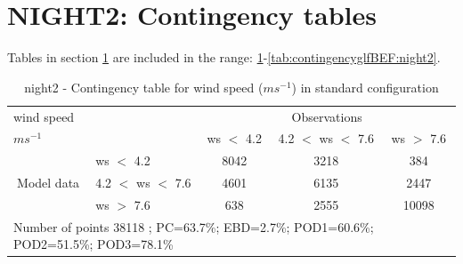 \section{NIGHT2: Contingency tables}\label{sec:night2:cont}
Tables in section \ref{sec:night2:cont} are included in the range: \ref{tab:contingencywsBEF:night2}-\ref{tab:contingencyglfBEF:night2}.
\begin{table}[h!]
\begin{center}
\begin{tabular}{llccc}
\hline
{wind speed}                                       &                                                    & \multicolumn{3}{c}{Observations}                 \\
{$m s^{-1}$}                                       &                             & ws $<$ 4.2   & 4.2 $<$ ws $<$ 7.6 & ws $>$ 7.6 \\
\hline
\multicolumn{1}{c}{\multirow{3}{*}{Model data}}  & ws $<$ 4.2             & 8042                & 3218                       & 384              \\
                                                 & 4.2  $<$ ws $<$ 7.6 & 4601                & 6135                       & 2447              \\
                                                 & ws $>$ 7.6             & 638                & 2555                       & 10098              \\
\hline 
\multicolumn{5}{l}{ Number of points        38118 ; PC=63.7\%; EBD=2.7\%; POD1=60.6\%; POD2=51.5\%; POD3=78.1\%}                 \\
\end{tabular}
\end{center}
\caption{night2 - Contingency table for {wind speed} ($m s^{-1}$) in standard configuration}
\label{tab:contingencywsBEF:night2}
\end{table}
